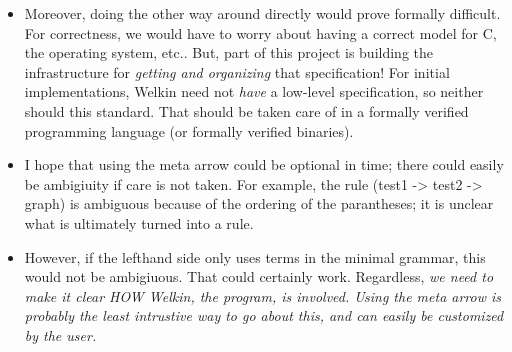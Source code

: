 \begin{itemize}
				\begin{itemize}
					\item Moreover, doing the other way around directly would prove formally difficult. For correctness, we would have to worry about having a correct model for C, the operating system, etc.. But, part of this project is building the infrastructure for \textit{getting and organizing} that specification! For initial implementations, Welkin need not \textit{have} a low-level specification, so neither should this standard. That should be taken care of in a formally verified programming language (or formally verified binaries).
					\item I hope that using the meta arrow could be optional in time; there could easily be ambigiuity if
								care is not taken. For example, the rule (test1 -> test2 -> graph) is ambiguous because of the ordering of the parantheses; it is unclear what is ultimately turned into a rule.
					\item However, if the lefthand side only uses terms in the minimal grammar, this would not be ambigiuous. That could certainly work. Regardless, \textit{we need to make it clear HOW Welkin, the program, is involved. Using the meta arrow is probably the least intrustive way to go about this, and can easily be customized by the user.}
				\end{itemize}


\end{itemize}
